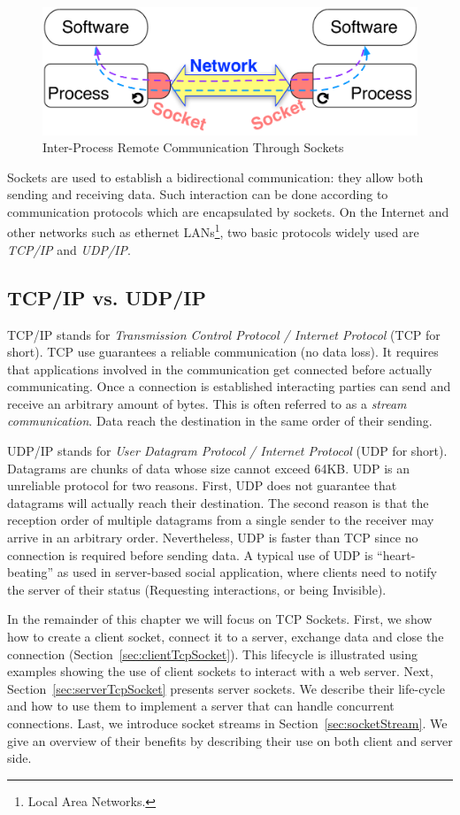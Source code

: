 \documentclass[a4paper,10pt,twoside]{book}
\begin{document}
\begin{figure}[ht]\centering
	\includegraphics[width=.75\linewidth]{socketConcept}
	\caption{Inter-Process Remote Communication Through Sockets}
	\label{fig:socketConcept}
\end{figure}

Sockets are used to establish a bidirectional communication: they allow both sending and receiving data. 
Such interaction can be done according to communication protocols which are encapsulated by sockets. On the Internet and other networks such as ethernet LANs\footnote{Local Area Networks.}, two basic protocols widely used are \textit{TCP/IP} and \textit{UDP/IP}.

\subsection{TCP/IP vs. UDP/IP}
TCP/IP stands for \textit{Transmission Control Protocol / Internet Protocol} (TCP for short).
TCP use guarantees a reliable communication (no data loss). It requires that applications involved in the communication get connected before actually communicating. 
Once a connection is established interacting parties can send and receive an arbitrary amount of bytes. This is often referred to as a \textit{stream communication}.
Data reach the destination in the same order of their sending.

UDP/IP stands for \textit{User Datagram Protocol / Internet Protocol} (UDP for short).
Datagrams are chunks of data whose size cannot exceed 64KB. UDP is an unreliable protocol for two reasons. First, UDP does not guarantee that  datagrams will actually reach their destination.
The second reason is that the reception order of multiple datagrams from a single sender to the receiver may arrive in an arbitrary order.
Nevertheless, UDP is faster than TCP since no connection is required before sending data.
A typical use of UDP is  ``heart-beating'' as used in server-based social application, where clients need to notify the server of their status (\eg Requesting interactions, or being Invisible).

In the remainder of this chapter we will focus on TCP Sockets.
First, we show how to create a client socket, connect it to a server, exchange data and close the connection (Section~\ref{sec:clientTcpSocket}).
This lifecycle is illustrated using examples showing the use of client sockets to interact with a web server. 
Next, Section~\ref{sec:serverTcpSocket} presents server sockets.
We describe their life-cycle and how to use them to implement a server that can handle concurrent connections.
Last, we introduce socket streams in Section~\ref{sec:socketStream}.
We give an overview of their benefits by describing their use on both client and server side.
 
\end{document}
